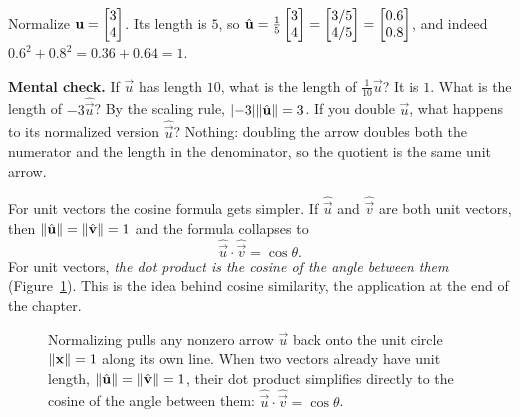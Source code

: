 \begin{example}
Normalize $\mathbf{u} = \begin{bmatrix}3\\4\end{bmatrix}$. Its length is $5$, so
$\hat{\mathbf{u}} = \tfrac15\begin{bmatrix}3\\4\end{bmatrix} = \begin{bmatrix}3/5\\4/5\end{bmatrix} = \begin{bmatrix}0.6\\0.8\end{bmatrix}$,
and indeed $0.6^2 + 0.8^2 = 0.36+0.64 = 1$. \checkmark
\end{example}

\textbf{Mental check.} If $\vec u$ has length $10$, what is the length of $\frac{1}{10}\vec u$?
It is $1$. What is the length of $-3\hat{\vec u}$? By the scaling rule, $\lvert-3\rvert\lVert\hat{\mathbf{u}}\rVert = 3$.
If you double $\vec u$, what happens to its normalized version $\hat{\vec u}$? Nothing:
doubling the arrow doubles both the numerator and the length in the denominator, so the
quotient is the same unit arrow.

For unit vectors the cosine formula gets simpler. If $\hat{\vec u}$ and
$\hat{\vec v}$ are both unit vectors, then
$\lVert\hat{\mathbf{u}}\rVert=\lVert\hat{\mathbf{v}}\rVert=1$ and the formula collapses to
\[
  \hat{\vec u}\cdot\hat{\vec v} = \cos\theta.
\]
For unit vectors, \emph{the dot product is the cosine of the angle between
them} (Figure~\ref{ch04:unit-circle}). This is the idea behind cosine similarity,
the application at the end of the chapter.

\begin{figure}[htbp]
\centering
{}
\caption{Normalizing pulls any nonzero arrow $\vec u$ back onto the unit circle $\lVert\mathbf{x}\rVert=1$ along its own line. When two vectors already have unit length, $\lVert\hat{\mathbf{u}}\rVert=\lVert\hat{\mathbf{v}}\rVert=1$, their dot product simplifies directly to the cosine of the angle between them: $\hat{\vec u}\cdot\hat{\vec v} = \cos\theta$.}
\label{ch04:unit-circle}
\end{figure}

